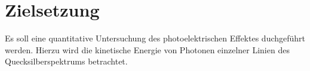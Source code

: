 
\section{Zielsetzung}
\label{sec:Zielsetzung}
Es soll eine quantitative Untersuchung des photoelektrischen Effektes duchgeführt werden.
Hierzu wird die kinetische Energie von Photonen einzelner Linien des Quecksilberspektrums
betrachtet. 
